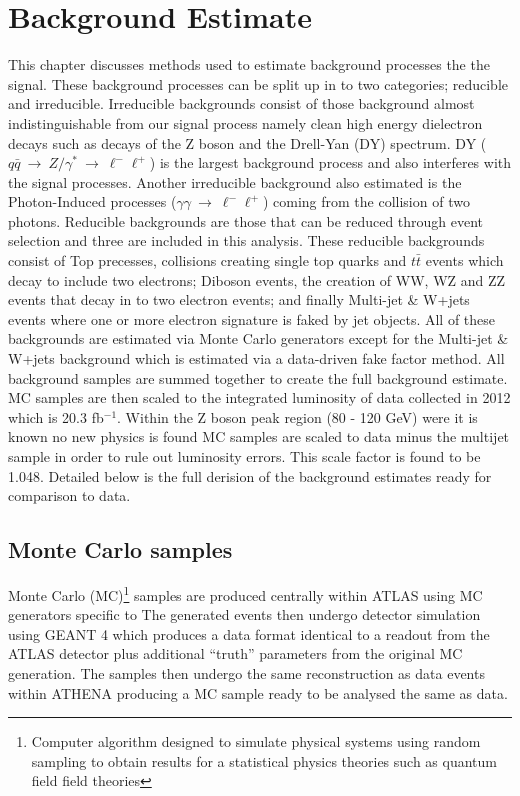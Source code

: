 \chapter{Background Estimate}

This chapter discusses methods used to estimate background processes the the signal. These background processes can be split up in to two categories; reducible and irreducible. Irreducible backgrounds consist of those background almost indistinguishable from our signal process namely clean high energy dielectron decays such as decays of the Z boson and the Drell-Yan (DY) spectrum. DY ($q\bar{q}~\rightarrow~Z/\gamma^{*}~\rightarrow~\ell^{-}\ell^{+}$) is the largest background process and also interferes with the signal processes. Another irreducible background also estimated is the Photon-Induced processes ($\gamma\gamma~\rightarrow~\ell^{-}\ell^{+}$) coming from the collision of two photons. Reducible backgrounds are those that can be reduced through event selection and three are included in this analysis. These reducible backgrounds consist of Top precesses, collisions creating single top quarks and $t\bar{t}$ events which decay to include two electrons; Diboson events, the creation of WW, WZ and ZZ events that decay in to two electron events; and finally Multi-jet \& W+jets events where one or more electron signature is faked by jet objects. All of these backgrounds are estimated via Monte Carlo generators except for the Multi-jet \& W+jets background which is estimated via a data-driven fake factor method. All background samples are summed together to create the full background estimate. MC samples are then scaled to the integrated luminosity of data collected in 2012 which is 20.3 fb$^{-1}$. Within the Z boson peak region (80 - 120 GeV) were it is known no new physics is found MC samples are scaled to data minus the multijet sample in order to rule out luminosity errors. This scale factor is found to be 1.048. Detailed below is the full derision of the background estimates ready for comparison to data.

\section{Monte Carlo samples}
   \label{sec:MC}

   Monte Carlo (MC)\footnote{Computer algorithm designed to simulate physical systems using random sampling to obtain results for a statistical physics theories such as quantum field field theories} samples are produced centrally within ATLAS using MC generators specific to  The generated events then undergo detector simulation using GEANT 4 \cite{} which produces a data format identical to a readout from the ATLAS detector plus additional ``truth'' parameters from the original MC generation. The samples then undergo the same reconstruction as data events within ATHENA producing a MC sample ready to be analysed the same as data.\\


